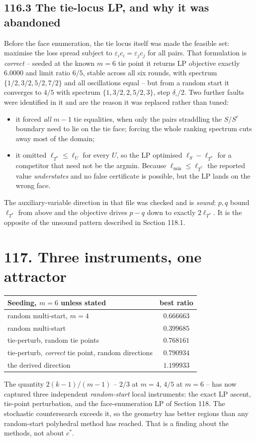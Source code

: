 \documentclass[9pt,twocolumn]{article}
\renewcommand{\_}{\CIGunderscore\allowbreak}
\begin{document}
\subsection*{116.3 The tie-locus LP, and why it was abandoned}
Before the face enumeration, the tie locus itself was made the feasible set: maximise the loss spread subject to $\varepsilon_ic_i=\varepsilon_jc_j$ for all pairs. That formulation is \emph{correct} -- seeded at the known $m=6$ tie point it returns LP objective exactly $6.0000$ and limit ratio $6/5$, stable across all six rounds, with spectrum $\{1/2,3/2,5/2,7/2\}$ and all oscillations equal -- but from a random start it converges to $4/5$ with spectrum $\{1,3/2,2,5/2,3\}$, step $\delta_{\square}/2$. Two further faults were identified in it and are the reason it was replaced rather than tuned:

\begin{itemize}
\item it forced \emph{all} $m-1$ tie equalities, when only the pairs straddling the $S/S^{c}$ boundary need to lie on the tie face; forcing the whole ranking spectrum cuts away most of the domain;
\item it omitted $\ell_{T^\ast}\le\ell_U$ for every $U$, so the LP optimised $\ell_S-\ell_{T^\ast}$ for a competitor that need not be the argmin. Because $\ell_{\min}\le\ell_{T^\ast}$ the reported value \emph{understates} and no false certificate is possible, but the LP lands on the wrong face.
\end{itemize}
The auxiliary-variable direction in that file was checked and is \emph{sound}: $p,q$ bound $\ell_{T^\ast}$ from above and the objective drives $p-q$ down to exactly $2\ell_{T^\ast}$. It is the opposite of the unsound pattern described in Section 118.1.

\section*{117. Three instruments, one attractor}
\begin{center}\scriptsize
\begin{tabularx}{0.98\columnwidth}{Xc}
\toprule
Seeding, $m=6$ unless stated & best ratio\\
\midrule
random multi-start, $m=4$ & $0.666663$\\
random multi-start & $0.399685$\\
tie-perturb, random tie points & $0.768161$\\
tie-perturb, \emph{correct} tie point, random directions & $0.790934$\\
the derived direction & $\mathbf{1.199933}$\\
\bottomrule
\end{tabularx}
\end{center}
The quantity $2(k-1)/(m-1)$ -- $2/3$ at $m=4$, $4/5$ at $m=6$ -- has now captured three independent \emph{random-start} local instruments: the exact LP ascent, tie-point perturbation, and the face-enumeration LP of Section 118. The stochastic countersearch exceeds it, so the geometry has better regions than any random-start polyhedral method has reached. That is a finding about the methods, not about $c^\ast$.
\end{document}
